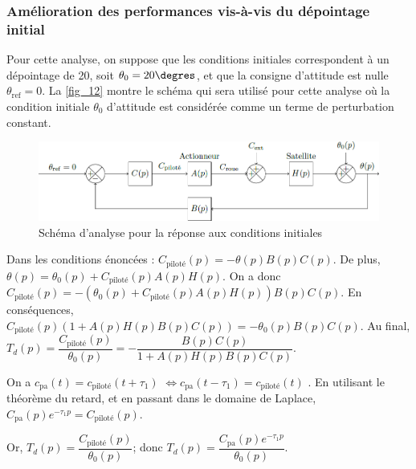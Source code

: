 \subsubsection{\label{sec:3:D:1} Amélioration des performances vis-à-vis du dépointage initial}

\ifprof
\else

Pour cette analyse, on suppose que les conditions initiales correspondent à un dépointage de 20\degres, soit $\theta_0 = 20\degres$,
et que la consigne d’attitude est nulle $\theta_{\text{ref}}=0$. La \autoref{fig_12} montre le schéma qui sera utilisé pour cette analyse
où la condition initiale $\theta_0$ d’attitude est considérée comme un terme de perturbation constant.

\begin{figure}[H]
\centering
\includegraphics[width=\linewidth]{images/fig_12}
\caption{Schéma d’analyse pour la réponse aux conditions initiales \label{fig_12}}
\end{figure}
\fi


\ifprof
\begin{corrige}
Dans les conditions énoncées : $C_{\text{piloté}}(p)=-\theta(p) B(p) C(p)$. De plus,$\theta(p)=\theta_0(p)+C_{\text{piloté}}(p) A(p) H(p)$. 
On a donc $C_{\text{piloté}}(p)=-\left( \theta_0(p)+C_{\text{piloté}}(p) A(p) H(p) \right) B(p) C(p)$.
En conséquences, $C_{\text{piloté}}(p)\left( 1+ A(p) H(p) B(p) C(p) \right)=- \theta_0(p) B(p) C(p)$.
Au final, $T_d(p)=\dfrac{C_{\text{piloté}}(p)}{\theta_0(p)} = -\dfrac{ B(p) C(p)}{ 1+ A(p) H(p) B(p) C(p)}$.


 On a $c_{\text{pa}}(t)=c_{\text{piloté}}(t+\tau_1)$ $\Leftrightarrow c_{\text{pa}}(t-\tau_1)=c_{\text{piloté}}(t) $ . En utilisant le théorème du retard, et en passant dans le domaine de Laplace, 
  $C_{\text{pa}}(p)e^{-\tau_1 p} =C_{\text{piloté}}(p)$. 
  
Or, $T_d(p)=\dfrac{C_{\text{piloté}}(p)}{\theta_0(p)}$; donc $T_d(p)=\dfrac{C_{\text{pa}}(p)e^{-\tau_1 p}}{\theta_0(p)}$.


\end{corrige}
\else
\fi

